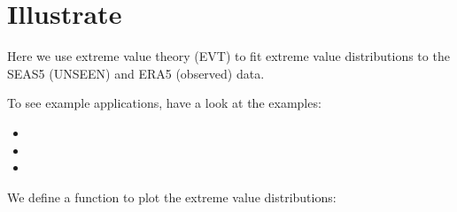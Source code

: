 \documentclass[letterpaper,10pt,english]{sphinxmanual}
\begin{document}
\section{Illustrate}
\label{\detokenize{Notebooks/3.Evaluate/3.Evaluate:Illustrate}}
Here we use extreme value theory (EVT) to fit extreme value distributions to the SEAS5 (UNSEEN) and ERA5 (observed) data.

To see example applications, have a look at the examples:
\begin{itemize}
\item {} 

\item {} 

\item {} 

\end{itemize}

We define a function to plot the extreme value distributions:
\end{document}
